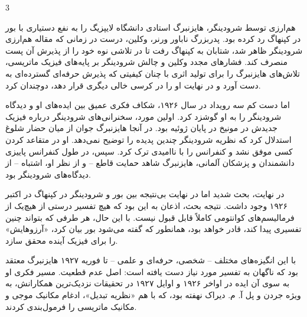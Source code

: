 \documentclass[11pt,a4paper]{article}
\begin{document}
\newpage

\begin{multicols}{3}

 هم‌ارزی توسط شرودینگر، هایزنبرگ استادی دانشگاه لایپزیگ را به نفع دستیاری با بور در کپنهاگ رد کرده بود. پدربزرگ ناباور ورنر، وکلین، درست در زمانی که مقاله هم‌ارزی شرودینگر ظاهر شد، شتابان به کپنهاگ رفت تا در تلاشی نوه خود را از پذیرش آن پست منصرف کند. فشارهای مجدد وکلین و چالش شرودینگر بر پایه‌های فیزیک ماتریسی، تلاش‌های هایزنبرگ را برای تولید اثری با چنان کیفیتی که پذیرش حرفه‌ای گسترده‌ای به دست آورد و در نهایت او را در کرسی خالی دیگری قرار دهد، دوچندان کرد.

اما دست کم سه رویداد در سال ۱۹۲۶، شکاف فکری عمیق بین ایده‌های او و دیدگاه شرودینگر را به او گوشزد کرد. اولین مورد، سخنرانی‌های شرودینگر درباره فیزیک جدیدش در مونیخ در پایان ژوئیه بود. در آنجا هایزنبرگ جوان از میان حضار شلوغ استدلال کرد که نظریه شرودینگر چندین پدیده را توضیح نمی‌دهد. او در متقاعد کردن کسی موفق نشد و کنفرانس را با ناامیدی ترک کرد. سپس، در طول کنفرانس پاییزی دانشمندان و پزشکان آلمانی، هایزنبرگ شاهد حمایت قاطع -- و از نظر او، اشتباه -- از دیدگاه‌های شرودینگر بود.

در نهایت، بحث شدید اما در نهایت بی‌نتیجه بین بور و شرودینگر در کپنهاگ در اکتبر ۱۹۲۶ وجود داشت. نتیجه بحث، اذعان به این بود که هیچ تفسیر درستی از هیچ‌یک از فرمالیسم‌های کوانتومی کاملاً قابل قبول نیست. با این حال، هر طرفی که بتواند چنین تفسیری پیدا کند، قادر خواهد بود، همانطور که گفته می‌شود بور بیان کرد، «آرزوهایش» را برای فیزیک آینده محقق سازد.

با این انگیزه‌های مختلف -- شخصی، حرفه‌ای و علمی -- تا فوریه ۱۹۲۷ هایزنبرگ معتقد بود که ناگهان به تفسیر مورد نیاز دست یافته است: اصل عدم قطعیت. مسیر فکری او به سوی آن ایده در اواخر ۱۹۲۶ و اوایل ۱۹۲۷ در تحقیقات نزدیک‌ترین همکارانش، به ویژه جردن و پل آ. م. دیراک نهفته بود، که با هم «نظریه تبدیل»، ادغام مکانیک موجی و مکانیک ماتریسی را فرمول‌بندی کردند.

\end{multicols}
\end{document}
